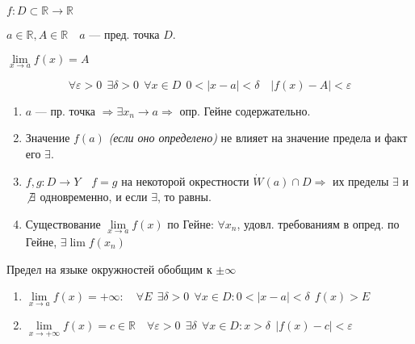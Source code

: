 \begin{consequence}
    $f:D\subset\mathbb{R} \to \mathbb{R}$
    
    $a\in\mathbb{R}, A\in\mathbb{R} \quad a$ --- пред. точка $D$.

    $\lim\limits_{x\to a} f(x)=A$

    $$\forall \varepsilon > 0 \ \ \exists \delta>0 \ \ \forall x\in D \ \ 0<|x-a|<\delta \quad |f(x)-A|<\varepsilon$$
\end{consequence}

\begin{remark}
    \begin{enumerate}
        \item $a$ --- пр. точка $\Rightarrow \exists x_n\to a \Rightarrow$ опр. Гейне содержательно.
        \item Значение $f(a)$ \textit{(если оно определено)} не влияет на значение предела и факт его $\exists$.
        \item $f,g:D\to Y \quad f=g$ на некоторой окрестности $\dot W(a)\cap D \Rightarrow$ их пределы $\exists$ и $\not \exists$ одновременно, и если $\exists$, то равны.
        \item Существование $\lim\limits_{x\to a} f(x)$ по Гейне: $\forall x_n$, удовл. требованиям в опред. по Гейне, $\exists\lim f(x_n)$
    \end{enumerate}
\end{remark}

Предел на языке окружностей обобщим к $\pm\infty$

\begin{enumerate}
    \item $\lim\limits_{x\to a}f(x)=+\infty: \quad \forall E \ \ \exists \delta>0 \ \ \forall x\in D : 0<|x-a|<\delta \ \ f(x)>E$
    \item $\lim\limits_{x\to +\infty}f(x)=c\in\mathbb{R} \quad \forall \varepsilon>0 \ \ \exists \delta \ \ \forall x\in D : x>\delta \ \ |f(x)-c|<\varepsilon$
\end{enumerate}

